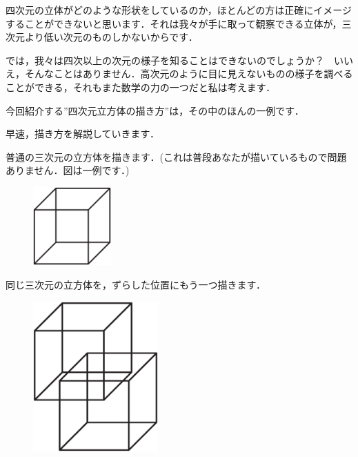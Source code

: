 \documentclass[./main]{subfiles} %
\begin{document}

\newtheorem{maskdefi}{定義}
\newtheorem{rem}{注意}


四次元の立体がどのような形状をしているのか，ほとんどの方は正確にイメージすることができないと思います．それは我々が手に取って観察できる立体が，三次元より低い次元のものしかないからです．

では，我々は四次以上の次元の様子を知ることはできないのでしょうか？　いいえ，そんなことはありません．高次元のように目に見えないものの様子を調べることができる，それもまた数学の力の一つだと私は考えます．

今回紹介する''四次元立方体の描き方''は，その中のほんの一例です．

早速，描き方を解説していきます．


普通の三次元の立方体を描きます．(これは普段あなたが描いているもので問題ありません．図は一例です．)

\begin{figure}[h]
\begin{center}
\includegraphics[width=30mm]{mask_rittai1.eps}
\end{center}
\end{figure}


同じ三次元の立方体を，ずらした位置にもう一つ描きます．

\begin{figure}[h]
\begin{center}
\includegraphics[width=48mm]{mask_rittai2.eps}
\end{center}
\end{figure}
\end{document}

